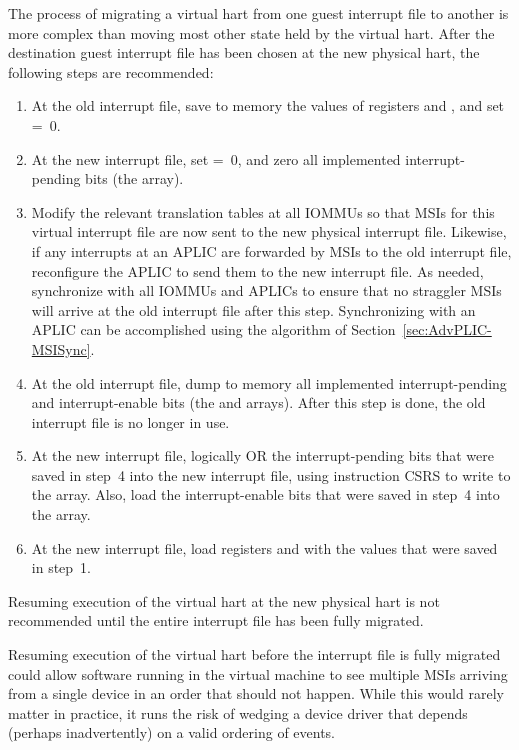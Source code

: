 The process of migrating a virtual hart from one guest interrupt file
to another is more complex than moving most other state held by the
virtual hart.
After the destination guest interrupt file has been chosen at the new
physical hart, the following steps are recommended:
\begin{enumerate}

\item
At the old interrupt file, save to memory the values of registers
 and , and set  =~0.

\item
At the new interrupt file, set  =~0, and zero all
implemented interrupt-pending bits (the  array).

\item
Modify the relevant translation tables at all \mbox{IOMMUs} so that MSIs for
this virtual interrupt file are now sent to the new physical interrupt
file.
Likewise, if any interrupts at an APLIC are forwarded by MSIs to the old
interrupt file, reconfigure the APLIC to send them to the new interrupt
file.
As needed, synchronize with all \mbox{IOMMUs} and APLICs to ensure that no
straggler MSIs will arrive at the old interrupt file after this step.
Synchronizing with an APLIC can be accomplished using the
algorithm of Section~\ref{sec:AdvPLIC-MSISync}.

\item
At the old interrupt file, dump to memory all implemented
interrupt-pending and interrupt-enable bits (the  and 
arrays).
After this step is done, the old interrupt file is no longer in use.

\item
At the new interrupt file, logically OR the interrupt-pending bits that
were saved in step~4 into the new interrupt file, using instruction
CSRS to write to the  array.
Also, load the interrupt-enable bits that were saved in step~4 into the
 array.

\item
At the new interrupt file, load registers  and
 with the values that were saved in step~1.

\end{enumerate}

Resuming execution of the virtual hart at the new physical hart is not
recommended until the entire interrupt file has been fully migrated.

\begin{commentary}
Resuming execution of the virtual hart before the interrupt file is
fully migrated could allow software running in the virtual machine to
see multiple MSIs arriving from a single device in an order that should
not happen.
While this would rarely matter in practice, it runs the risk of
wedging a device driver that depends (perhaps inadvertently) on a valid
ordering of events.
\end{commentary}

